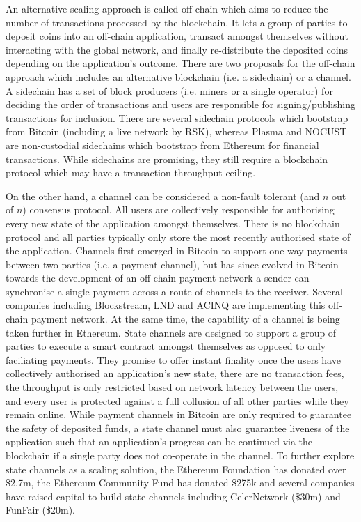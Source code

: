 \documentclass{llncs}
\begin{document}
An alternative scaling approach is called off-chain which aims to reduce the number of transactions processed by the blockchain.
It lets a group of parties to deposit coins into an off-chain application, transact amongst themselves without interacting with the global network, and finally re-distribute the deposited coins depending on the application's outcome. 
There are two proposals for the off-chain approach which includes an alternative blockchain (i.e. a sidechain) or a channel. 
A sidechain has a set of block producers (i.e. miners or a single operator) for deciding the order of transactions and users are responsible for signing/publishing transactions for inclusion. 
There are several sidechain protocols which bootstrap from Bitcoin (including a live network by RSK), whereas Plasma and NOCUST are non-custodial sidechains which bootstrap from Ethereum for financial transactions.
While sidechains are promising, they still require a blockchain protocol which may have a transaction throughput ceiling.

On the other hand, a channel can be considered a non-fault tolerant (and $n$ out of $n$) consensus protocol.
All users are collectively responsible for authorising every new state of the application amongst themselves.
There is no blockchain protocol and all parties typically only store the most recently authorised state of the application. 
Channels first emerged in Bitcoin to support one-way payments between two parties (i.e. a payment channel), but has since evolved in Bitcoin towards the development of an off-chain payment network a sender can synchronise a single payment across a route of channels to the receiver. 
Several companies including Blockstream, LND and ACINQ are implementing this off-chain payment network.
At the same time, the capability of a channel is being taken further in Ethereum. 
State channels are designed to support a group of parties to execute a smart contract amongst themselves as opposed to only faciliating payments. 
They promise to offer instant finality once the users have collectively authorised an application's new state, there are no transaction fees, the throughput is only restricted based on network latency between the users, and every user is protected against a full collusion of all other parties while they remain online. 
While payment channels in Bitcoin are only required to guarantee the safety of deposited funds, a state channel must also guarantee liveness of the application such that an application's progress can be continued via the blockchain if a single party does not co-operate in the channel. 
To further explore state channels as a scaling solution, the Ethereum Foundation has donated over \$2.7m, the Ethereum Community Fund has donated \$275k and several companies have raised capital to build state channels including CelerNetwork (\$30m) and FunFair (\$20m).
\end{document}
